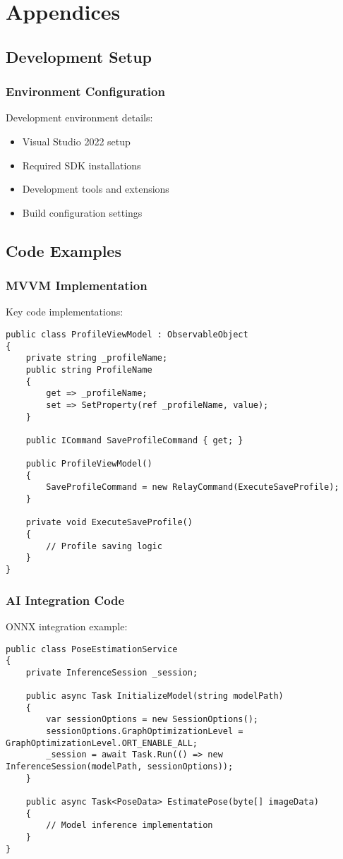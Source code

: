 \chapter{Appendices}

\section{Development Setup}
\subsection{Environment Configuration}
Development environment details:
\begin{itemize}
    \item Visual Studio 2022 setup
    \item Required SDK installations
    \item Development tools and extensions
    \item Build configuration settings
\end{itemize}

\section{Code Examples}
\subsection{MVVM Implementation}
Key code implementations:

\begin{verbatim}
public class ProfileViewModel : ObservableObject
{
    private string _profileName;
    public string ProfileName
    {
        get => _profileName;
        set => SetProperty(ref _profileName, value);
    }

    public ICommand SaveProfileCommand { get; }
    
    public ProfileViewModel()
    {
        SaveProfileCommand = new RelayCommand(ExecuteSaveProfile);
    }

    private void ExecuteSaveProfile()
    {
        // Profile saving logic
    }
}
\end{verbatim}

\subsection{AI Integration Code}
ONNX integration example:

\begin{verbatim}
public class PoseEstimationService
{
    private InferenceSession _session;

    public async Task InitializeModel(string modelPath)
    {
        var sessionOptions = new SessionOptions();
        sessionOptions.GraphOptimizationLevel = GraphOptimizationLevel.ORT_ENABLE_ALL;
        _session = await Task.Run(() => new InferenceSession(modelPath, sessionOptions));
    }

    public async Task<PoseData> EstimatePose(byte[] imageData)
    {
        // Model inference implementation
    }
}
\end{verbatim}

